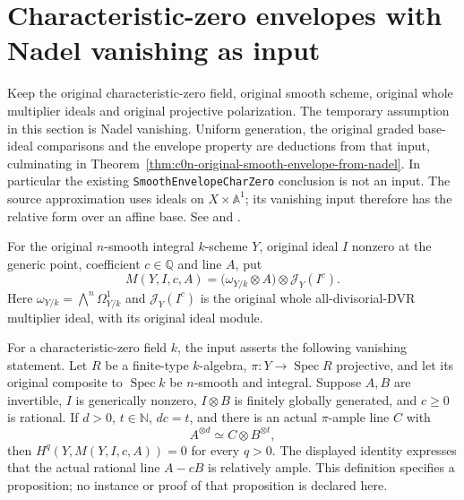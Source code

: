 \section{Characteristic-zero envelopes with Nadel vanishing as input}
\label{sec:c0n-char0-after-nadel}

Keep the original characteristic-zero field, original smooth scheme,
original whole multiplier ideals and original projective polarization.
The temporary assumption in this section is Nadel vanishing.  Uniform
generation, the original graded base-ideal comparisons and the envelope
property are deductions from that input, culminating in
Theorem~\ref{thm:c0n-original-smooth-envelope-from-nadel}.  In particular the existing
\nolinkurl{SmoothEnvelopeCharZero} conclusion is not an input.
The source approximation uses ideals on $X\times\mathbb A^1$; its
vanishing input therefore has the relative form over an affine base.
See \cite[Theorem~5.20]{BJ22} and \cite[Theorem~3.1]{FHX}.

\begin{definition}
\label{def:c0n-original-nadel-module}
\leanok
For the original $n$-smooth integral $k$-scheme $Y$, original ideal $I$
nonzero at the generic point, coefficient $c\in\mathbb Q$ and line $A$,
put
\[
 M(Y,I,c,A)=\bigl(\omega_{Y/k}\otimes A\bigr)
                 \otimes\mathcal J_Y(I^c).
\]
Here $\omega_{Y/k}=\bigwedge^n\Omega^1_{Y/k}$ and
$\mathcal J_Y(I^c)$ is the original whole all-divisorial-DVR multiplier
ideal, with its original ideal module.
\end{definition}

\begin{definition}
\label{def:c0n-relative-ample-nadel-input}
\leanok
For a characteristic-zero field $k$, the input asserts the following
vanishing statement.  Let $R$ be a finite-type $k$-algebra,
$\pi:Y\to\operatorname{Spec}R$ projective, and let its original composite
to $\operatorname{Spec}k$ be $n$-smooth and integral.  Suppose $A,B$ are
invertible, $I$ is generically nonzero, $I\otimes B$ is finitely globally
generated, and $c\geq0$ is rational.  If $d>0$, $t\in\mathbb N$,
$dc=t$, and there is an actual $\pi$-ample line $C$ with
\[
 A^{\otimes d}\simeq C\otimes B^{\otimes t},
\]
then $H^q(Y,M(Y,I,c,A))=0$ for every $q>0$.
The displayed identity expresses that the actual rational line $A-cB$
is relatively ample.  This definition specifies a proposition; no
instance or proof of that proposition is declared here.
\end{definition}

